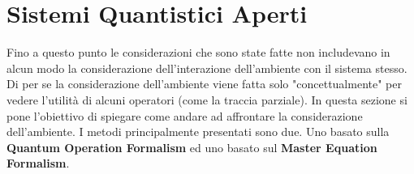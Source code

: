 \section{Sistemi Quantistici Aperti}
Fino a questo punto le considerazioni che sono state fatte non includevano in alcun modo la considerazione dell'interazione dell'ambiente con il sistema stesso. Di per se la considerazione dell'ambiente viene fatta solo "concettualmente" per vedere l'utilità di alcuni operatori (come la traccia parziale). In questa sezione si pone l'obiettivo di spiegare come andare ad affrontare la considerazione dell'ambiente. I metodi principalmente presentati sono due. Uno basato sulla \textbf{Quantum Operation Formalism} ed uno basato sul \textbf{Master Equation Formalism}.



